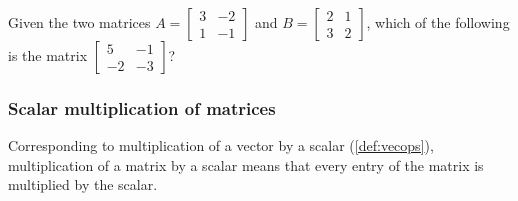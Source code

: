 \begin{activity}
Given the two matrices \(A=\begin{bmatrix} 3&-2\\1&-1 \end{bmatrix}\) and \(B=\begin{bmatrix} 2&1\\3&2 \end{bmatrix}\), which of the following is the matrix \(\begin{bmatrix} 5&-1\\-2&-3 \end{bmatrix}\)?
\end{activity}




\subsubsection{Scalar multiplication of matrices}

Corresponding to multiplication of a vector by a scalar (\cref{def:vecops}), multiplication of a matrix by a scalar means that every entry of the matrix is multiplied by the scalar.

